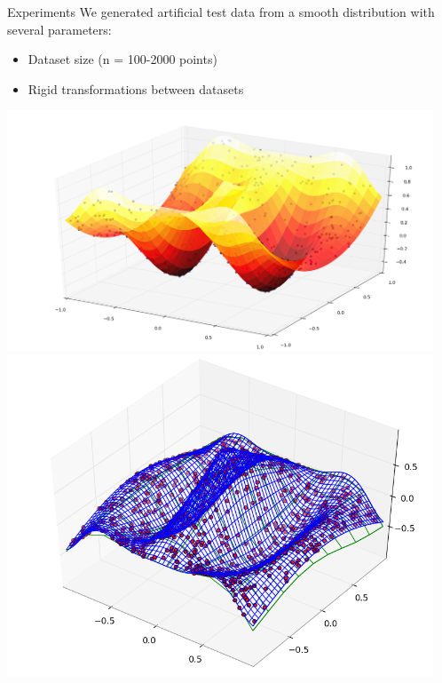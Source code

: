 \documentclass[final]{beamer}
\begin{document}
\begin{frame}{}
\begin{textblock}{27}
\begin{block}{Experiments}
We generated artificial test data from a smooth distribution with several parameters:
\begin{itemize}
\item Dataset size (n = 100-2000 points)
\item Rigid transformations between datasets
\end{itemize}
\includegraphics[width=5in]{DistributionPlusPoints.png}
\includegraphics[width=5in]{Reconstruction.png}

\end{block}






\end{textblock}
\end{frame}
\end{document}
